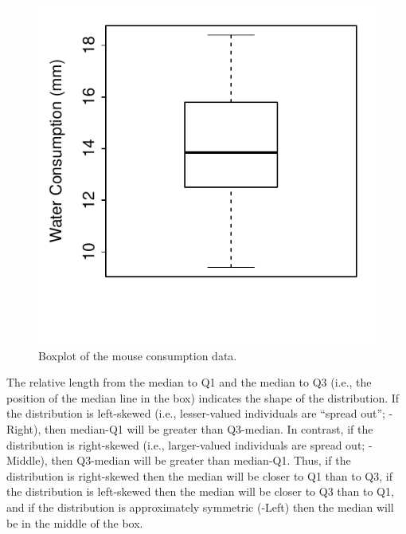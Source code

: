 \documentclass[10pt,openany]{book}\usepackage[]{graphicx}\usepackage[]{color}
\newenvironment{knitrout}{}{} %
\begin{document}
\begin{knitrout}
\color{fgcolor}\begin{figure}[hbtp]

{\centering \includegraphics[width=.4\linewidth]{Figs/MouseBoxplot-1} 

}

\caption[Boxplot of the mouse consumption data]{Boxplot of the mouse consumption data.}\label{fig:MouseBoxplot}
\end{figure}


\end{knitrout}


The relative length from the median to Q1 and the median to Q3 (i.e., the position of the median line in the box) indicates the shape of the distribution.  If the distribution is left-skewed (i.e., lesser-valued individuals are ``spread out''; -Right), then median-Q1 will be greater than Q3-median.  In contrast, if the distribution is right-skewed (i.e., larger-valued individuals are spread out; -Middle), then Q3-median will be greater than median-Q1.  Thus, if the distribution is right-skewed then the median will be closer to Q1 than to Q3, if the distribution is left-skewed then the median will be closer to Q3 than to Q1, and if the distribution is approximately symmetric (-Left) then the median will be in the middle of the box.
\end{document}

